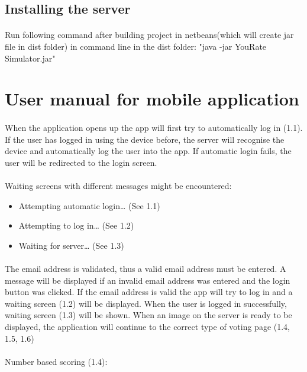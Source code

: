 \documentclass[10pt,a4paper]{article}
\begin{document}
\subsection{Installing the server}
\paragraph{}
Run following command after building project in netbeans(which will create jar file in dist folder) in command line in the dist folder: "java -jar YouRate Simulator.jar"
\section{User manual for mobile application}
\paragraph{}
When the application opens up the app will first try to automatically log in (1.1). If the user has logged in using the device before, the server will recognise the device and automatically log the user into the app. If automatic login fails, the user will be redirected to the login screen.
\paragraph{}
Waiting screens with different messages might be encountered:
\begin{itemize}
\item Attempting automatic login… (See 1.1)
\item Attempting to log in… (See 1.2)
\item Waiting for server…  (See 1.3)
\end{itemize}
\paragraph{}
The email address is validated, thus a valid email address must be entered. A message will be displayed if an invalid email address was entered and the login button was clicked. If the email address is valid the app will try to log in and a waiting screen (1.2) will be displayed. When the user is logged in successfully, waiting screen (1.3) will be shown. When an image on the server is ready to be displayed, the application will continue to the correct type of voting page (1.4, 1.5, 1.6)
\paragraph{}
Number based scoring (1.4):
\end{document}
